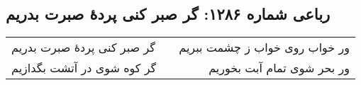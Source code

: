 \begin{center}
\section*{رباعی شماره ۱۲۸۶: گر صبر کنی پردهٔ صبرت بدریم}
\label{sec:1286}
\begin{longtable}{l p{0.5cm} r}
گر صبر کنی پردهٔ صبرت بدریم
&&
ور خواب روی خواب ز چشمت ببریم
\\
گر کوه شوی در آتشت بگدازیم
&&
ور بحر شوی تمام آبت بخوریم
\\
\end{longtable}
\end{center}
